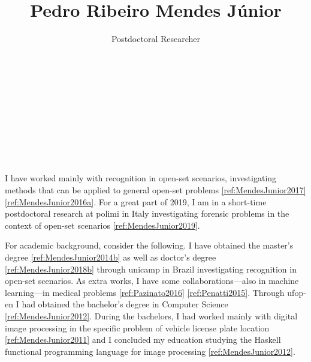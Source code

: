 

\title{Pedro Ribeiro Mendes Júnior}

\author{Postdoctoral Researcher\\%
  \\%
  \\%
  \\%
  \\%
  \\%
  \\%
  \\%
  \\%
}
\date{}



\maketitle

I have worked mainly with recognition in open-set scenarios, investigating methods that can be applied to general open-set problems \ref{ref:MendesJunior2017} \ref{ref:MendesJunior2016a}.
For a great part of 2019, I am in a short-time postdoctoral research at \gls{polimi} in Italy investigating forensic problems in the context of open-set scenarios \ref{ref:MendesJunior2019}.

For academic background, consider the following.
I have obtained the master's degree \ref{ref:MendesJunior2014b} as well as doctor's degree \ref{ref:MendesJunior2018b} through \gls{unicamp} in Brazil investigating recognition in open-set scenarios.
As extra works, I have some collaborations---also in machine learning---in medical problems \ref{ref:Pazinato2016} \ref{ref:Penatti2015}.
Through \gls{ufop-en} I had obtained the bachelor's degree in Computer Science \ref{ref:MendesJunior2012}.
During the bachelors, I had worked mainly with digital image processing in the specific problem of vehicle license plate location \ref{ref:MendesJunior2011} and I concluded my education studying the Haskell functional programming language for image processing \ref{ref:MendesJunior2012}.

